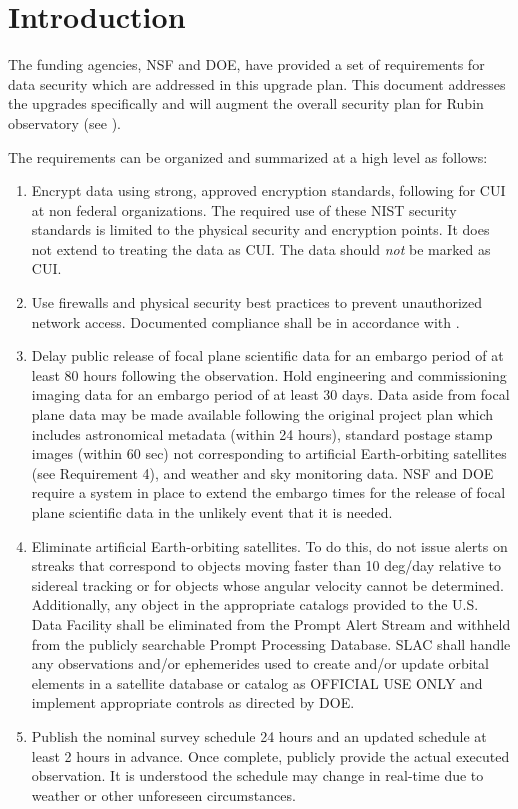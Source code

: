 \section{Introduction}

The funding agencies, \gls{NSF} and \gls{DOE},  have provided a set of requirements for data security which are addressed in this upgrade plan.  This document addresses the upgrades specifically and will augment the overall security plan for Rubin observatory (see ).

The requirements can be organized and summarized at a high level as follows:
\begin{enumerate}

\item	Encrypt data using strong, approved encryption standards,  following  for \gls{CUI} at non federal organizations. The required use of these \gls{NIST} security standards is limited to the physical security and encryption points. It does not extend to treating the data as \gls{CUI}. The data should \emph{not} be marked as \gls{CUI}.
\item	Use firewalls and physical security best practices to prevent unauthorized network  access. Documented compliance shall be in accordance with .
\item	Delay public release of  focal plane scientific data for an embargo period of at least 80 hours following the  observation.
Hold engineering and commissioning imaging data for an embargo period of at least 30 days.
Data aside from focal plane data may be made available following the original project plan which includes astronomical metadata (within 24 hours), standard \gls{postage stamp} images (within 60 sec) not corresponding to artificial  Earth-orbiting satellites (see Requirement 4), and weather and sky monitoring data.
NSF and \gls{DOE} require a system in  place to extend the embargo times for the release of focal plane scientific data in the unlikely event that it is needed.

\item	Eliminate artificial Earth-orbiting satellites.
To do this, do not issue alerts on streaks that correspond to objects  moving faster than 10 \gls{deg}/day relative to sidereal tracking or for objects whose angular velocity cannot be determined.
Additionally, any object in the appropriate catalogs provided to the U.S. Data Facility shall be eliminated from the  Prompt \gls{Alert} Stream and withheld from the publicly searchable Prompt Processing Database.
SLAC shall handle any  observations and/or ephemerides used to create and/or update orbital elements in a satellite database or catalog as  OFFICIAL USE ONLY and implement appropriate controls as directed by \gls{DOE}.
\item	Publish the nominal survey schedule 24 hours and an updated schedule at least 2 hours in advance.
Once complete, publicly provide the actual executed observation.
It is understood the schedule may change in real-time due to  weather or other unforeseen circumstances.


\end{enumerate}

